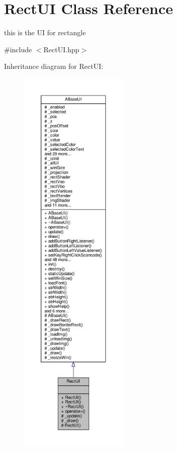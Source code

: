 \hypertarget{class_rect_u_i}{}\section{Rect\+UI Class Reference}
\label{class_rect_u_i}


this is the UI for rectangle  




{\ttfamily \#include $<$Rect\+U\+I.\+hpp$>$}



Inheritance diagram for Rect\+UI\+:
\nopagebreak
\begin{figure}[H]
\begin{center}
\leavevmode
\includegraphics[height=550pt]{class_rect_u_i__inherit__graph}
\end{center}
\end{figure}


